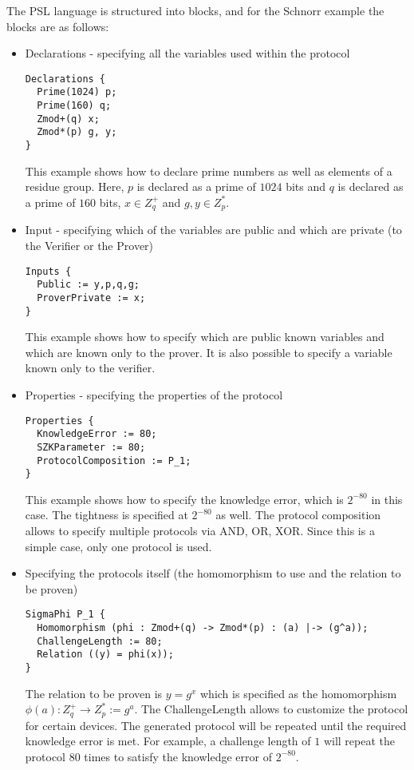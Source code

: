 The PSL language is structured into blocks, and for the Schnorr
example the blocks are as follows:
\begin{itemize}
\item Declarations - specifying all the variables used within
  the protocol
\begin{lstlisting}[language=PSL]
Declarations {
  Prime(1024) p;
  Prime(160) q;
  Zmod+(q) x;
  Zmod*(p) g, y;
}
\end{lstlisting}
  This example shows how to declare prime numbers as well as elements
  of a residue group. Here, $p$ is declared as a prime of $1024$ bits
  and $q$ is declared as a prime of $160$ bits, $x \in Z_q^+$ and $g,
  y \in Z_p^*$.
\item Input - specifying which of the variables are public and which
  are private (to the Verifier or the Prover)
\begin{lstlisting}[language=PSL]
Inputs {
  Public := y,p,q,g;
  ProverPrivate := x;
}
\end{lstlisting}
  This example shows how to specify which are public known variables
  and which are known only to the prover. It is also possible to
  specify a variable known only to the verifier.
\item Properties - specifying the properties of the protocol
\begin{lstlisting}[language=PSL]
Properties {
  KnowledgeError := 80;
  SZKParameter := 80;
  ProtocolComposition := P_1;
}
\end{lstlisting}
  This example shows how to specify the knowledge error, which is
  $2^{-80}$ in this case. The tightness is specified at $2^{-80}$ as
  well. The protocol composition allows to specify multiple protocols
  via AND, OR, XOR. Since this is a simple case, only one protocol is
  used.

\item Specifying the protocols itself (the homomorphism to
  use and the relation to be proven)
\begin{lstlisting}[language=PSL]
SigmaPhi P_1 {
  Homomorphism (phi : Zmod+(q) -> Zmod*(p) : (a) |-> (g^a));
  ChallengeLength := 80;
  Relation ((y) = phi(x));
}
\end{lstlisting}
  The relation to be proven is $y = g^x$ which is specified as the
  homomorphism $\phi(a) : Z_q^+ \rightarrow Z_p^* := g^a$. The
  ChallengeLength allows to customize the protocol for certain
  devices.  The generated protocol will be repeated until the required
  knowledge error is met. For example, a challenge length of $1$ will
  repeat the protocol $80$ times to satisfy the knowledge error of
  $2^{-80}$.

\end{itemize}


